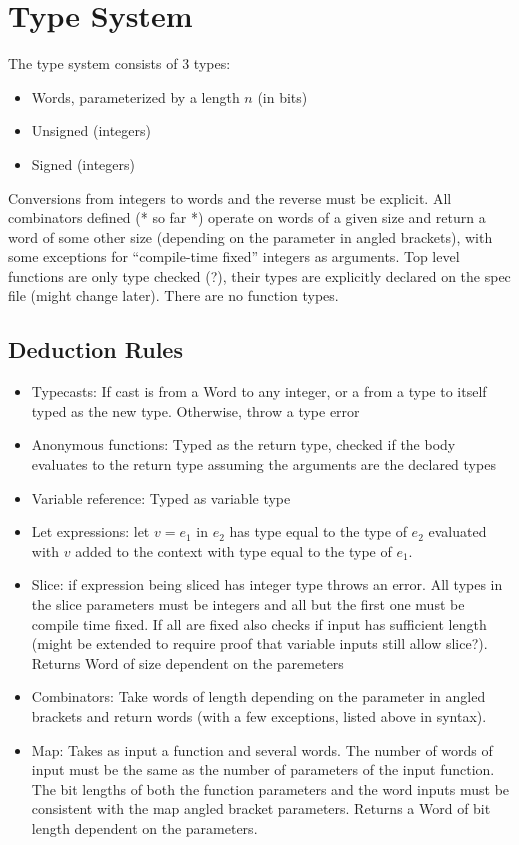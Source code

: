 \documentclass{article}
\begin{document}
  \section{Type System}
  The type system consists of 3 types:
  \begin{itemize}
  \item Words, parameterized by a length $n$ (in bits)
  \item Unsigned (integers)
  \item Signed (integers)
  \end{itemize}
  Conversions from integers to words and the reverse must be explicit.  All
  combinators defined (* so far *) operate on words of a given size and return a
  word of some other size (depending on the parameter in angled brackets), with
  some exceptions for ``compile-time fixed'' integers as arguments.  Top level
  functions are only type checked (?), their types are explicitly declared on
  the spec file (might change later). There are no function types.
  \subsection{Deduction Rules}
  \begin{itemize}
  \item Typecasts: If cast is from a Word to any integer, or a from a type to
    itself typed as the new type. Otherwise, throw a type error
  \item Anonymous functions: Typed as the return type, checked if the body
    evaluates to the return type assuming the arguments are the declared types
  \item Variable reference: Typed as variable type 
  \item Let expressions: let $v=e_1$ in $e_2$ has type equal to the type of
    $e_2$ evaluated with $v$ added to the context with type equal to the type of
    $e_1$.
  \item Slice: if expression being sliced has integer type throws an error. All
    types in the slice parameters must be integers and all but the first one
    must be compile time fixed. If all are fixed also checks if input has
    sufficient length (might be extended to require proof that variable inputs
    still allow slice?). Returns Word of size dependent on the paremeters
  \item Combinators: Take words of length depending on the parameter in angled
    brackets and return words (with a few exceptions, listed above in syntax).
  \item Map: Takes as input a function and several words. The number of words of
    input must be the same as the number of parameters of the input
    function. The bit lengths of both the function parameters and the word
    inputs must be consistent with the map angled bracket parameters. Returns a
    Word of bit length dependent on the parameters.
  \end{itemize}
\end{document}
